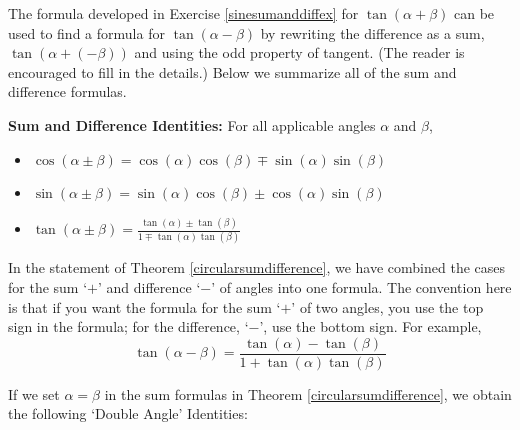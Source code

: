 \documentclass{ximera}
\begin{document}
The formula developed in Exercise \ref{sinesumanddiffex} for $\tan(\alpha + \beta)$ can be used to find a formula for $\tan(\alpha - \beta)$ by rewriting the difference as a sum, $\tan(\alpha + (-\beta))$ and using the odd property of tangent.  (The reader is encouraged to fill in the details.)  Below we summarize all of the sum and difference formulas.

 


\begin{theorem} \label{circularsumdifference}  \textbf{Sum and Difference Identities:} For all applicable angles $\alpha$ and $\beta$,      

\begin{itemize}

\item  $\cos(\alpha \pm \beta) = \cos(\alpha) \cos(\beta) \mp \sin(\alpha) \sin(\beta)$

\item  $\sin(\alpha \pm \beta) = \sin(\alpha) \cos(\beta) \pm \cos(\alpha) \sin(\beta)$

\item $\tan(\alpha \pm \beta) =  \frac{\tan(\alpha) \pm \tan(\beta)}{1 \mp \tan(\alpha) \tan(\beta)}$

\end{itemize}

\end{theorem}

 


 

In the statement of Theorem \ref{circularsumdifference}, we have combined the cases for the sum `$+$' and difference `$-$' of angles into one formula.  The convention here is that if you want the formula for the sum `$+$' of two angles, you use the top sign in the formula;  for the difference, `$-$', use the bottom sign.  For example, \[\tan(\alpha - \beta) =  \frac{\tan(\alpha) - \tan(\beta)}{1 + \tan(\alpha) \tan(\beta)}\]

If we set $\alpha = \beta$  in the sum formulas in Theorem \ref{circularsumdifference}, we obtain the following `Double Angle' Identities:

 

\end{document}
